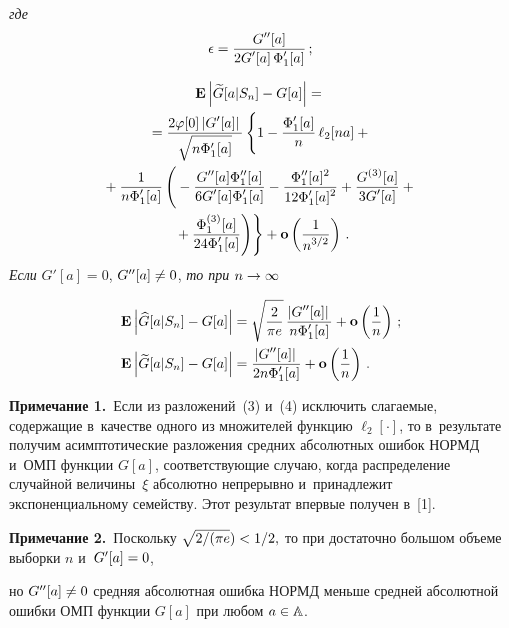 \begin{multicols}{2}
 \noindent
\textit{где}
$$
\epsilon=\displaystyle\frac{\displaystyle G''[a]\mathstrut}{\displaystyle 2G'[a]\,\Phi_1 '[a]\mathstrut}\,;
$$

\vspace*{-12pt}

\noindent
  \begin{multline}
\mathbf{E} \left|\widetilde{G}[a|S_n]-G[a]\right|={}\\
{}=
  \fr{2\varphi[0]\left|G'[a]\right|}{\sqrt{n\Phi_1 '[a]}}
 \left\{
 \vphantom{\fr{\Phi_1^{(3)}[a]}{24 \Phi_1'[a]}}
 1 -\fr{\Phi_1 '[a]}{n}\,\ell_2[na]+{}\right.\\ 
 {} +\fr{1}{n\Phi_1'[a]}\left(
 \vphantom{\fr{\Phi_1^{(3)}[a]}{24 \Phi_1'[a]}}
  -\fr{G''[a] \Phi_1''[a]}{6 G'[a] \Phi_1'[a]}
  -\fr{\Phi_1''[a]^2}{12\Phi_1'[a]^2}
  +\fr{ G^{(3)}[a]}{3 G'[a] }
  +{}\right.\\
\left.\left.  {}+\fr{\Phi_1^{(3)}[a]}{24 \Phi_1'[a]}\right)\right\}
  +\mathbf{o}\left(\fr{1}{n^{3/2}}\right)\,.
  \label{e4-ch}
 \end{multline}
  \textit{Если}  $G'[a]= 0$, $G''[a]\hm\neq 0$, \textit{то при} $n \hm\to \infty$
  
  \noindent
  \begin{align}
 \mathbf{E} &\left|\widehat{G}[a|S_n]-G[a]\right|=
   \sqrt{\displaystyle\frac{\displaystyle 2\mathstrut}{\displaystyle \pi e\mathstrut}}\,\displaystyle\frac{\displaystyle \left|G''[a]\right|\mathstrut}{\displaystyle  n \Phi_1'[a]\mathstrut}+\mathbf{o}\left(
   \displaystyle\frac{\displaystyle 1\mathstrut}{\displaystyle n\mathstrut}\right)\,;
 \label{e5-ch}\\
 \mathbf{E} &\left|\widetilde{G}[a|S_n]-G[a]\right|=
   \displaystyle\frac{\displaystyle \left|G''[a]\right|\mathstrut}{\displaystyle 2n \Phi_1'[a]\mathstrut}+\mathbf{o}\left(\displaystyle\frac{\displaystyle 1\mathstrut}{\displaystyle n\mathstrut}\right)\,.
 \label{e6-ch}
  \end{align}

\noindent
\textbf{Примечание 1.}\ 
Если из разложений~(3) и~(4) исключить слагаемые, содержащие в~качестве одного 
из множителей функцию $\ell_2[\cdot]$, то в~результате получим асимптотические 
разложения средних абсолютных ошибок НОРМД и~ОМП функции $G[a]$, соответствующие 
случаю, когда распределение случайной величины~$\xi$ абсолютно непрерывно 
и~принадлежит экспоненциальному семейству. Этот результат впервые получен в~[1].


\noindent
\textbf{Примечание 2.}\ Поскольку $\sqrt{{2}/({\pi e}})\hm< {1}/{2},$
 то при достаточно большом объеме выборки $n$ и~$G'[a]\hm=0$,\linebreak\vspace*{-12pt}
 
 \pagebreak
 
 \noindent 
 но $G''[a]\hm\neq 0$ средняя абсолютная ошибка НОРМД меньше средней 
 абсолютной ошибки ОМП функции $G[a]$  при любом $a\hm\in {\mathbb A}$.


\end{multicols}
